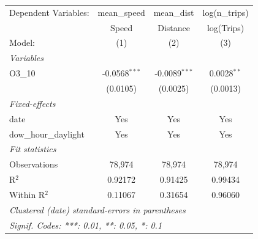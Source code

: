 \begingroup
\centering
\begin{tabular}{lccc}
   \tabularnewline \midrule \midrule
   Dependent Variables:  & mean\_speed     & mean\_dist      & log(n\_trips)\\   
                         & Speed           & Distance        & log(Trips) \\   
   Model:                & (1)             & (2)             & (3)\\  
   \midrule
   \emph{Variables}\\
   O3\_10                & -0.0568$^{***}$ & -0.0089$^{***}$ & 0.0028$^{**}$\\   
                         & (0.0105)        & (0.0025)        & (0.0013)\\   
   \midrule
   \emph{Fixed-effects}\\
   date                  & Yes             & Yes             & Yes\\  
   dow\_hour\_daylight   & Yes             & Yes             & Yes\\  
   \midrule
   \emph{Fit statistics}\\
   Observations          & 78,974          & 78,974          & 78,974\\  
   R$^2$                 & 0.92172         & 0.91425         & 0.99434\\  
   Within R$^2$          & 0.11067         & 0.31654         & 0.96060\\  
   \midrule \midrule
   \multicolumn{4}{l}{\emph{Clustered (date) standard-errors in parentheses}}\\
   \multicolumn{4}{l}{\emph{Signif. Codes: ***: 0.01, **: 0.05, *: 0.1}}\\
\end{tabular}
\par\endgroup
